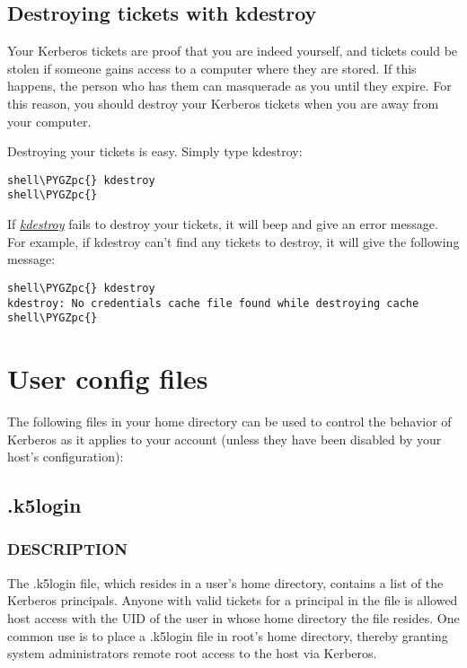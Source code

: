 \documentclass[letterpaper,10pt,english]{sphinxmanual}
\def\PYGZpc{\char`\%}
\begin{document}
\section{Destroying tickets with kdestroy}
\label{user/tkt_mgmt:destroying-tickets-with-kdestroy}
Your Kerberos tickets are proof that you are indeed yourself, and
tickets could be stolen if someone gains access to a computer where
they are stored.  If this happens, the person who has them can
masquerade as you until they expire.  For this reason, you should
destroy your Kerberos tickets when you are away from your computer.

Destroying your tickets is easy.  Simply type kdestroy:

\begin{Verbatim}[commandchars=\\\{\}]
shell\PYGZpc{} kdestroy
shell\PYGZpc{}
\end{Verbatim}

If {\hyperref[user/user_commands/kdestroy:kdestroy-1]{\emph{kdestroy}}} fails to destroy your tickets, it will beep and
give an error message.  For example, if kdestroy can't find any
tickets to destroy, it will give the following message:

\begin{Verbatim}[commandchars=\\\{\}]
shell\PYGZpc{} kdestroy
kdestroy: No credentials cache file found while destroying cache
shell\PYGZpc{}
\end{Verbatim}


\chapter{User config files}
\label{user/user_config/index::doc}\label{user/user_config/index:user-config-files}
The following files in your home directory can be used to control the
behavior of Kerberos as it applies to your account (unless they have
been disabled by your host's configuration):


\section{.k5login}
\label{user/user_config/k5login:k5login-5}\label{user/user_config/k5login:k5login}\label{user/user_config/k5login::doc}

\subsection{DESCRIPTION}
\label{user/user_config/k5login:description}
The .k5login file, which resides in a user's home directory, contains
a list of the Kerberos principals.  Anyone with valid tickets for a
principal in the file is allowed host access with the UID of the user
in whose home directory the file resides.  One common use is to place
a .k5login file in root's home directory, thereby granting system
administrators remote root access to the host via Kerberos.
\end{document}
